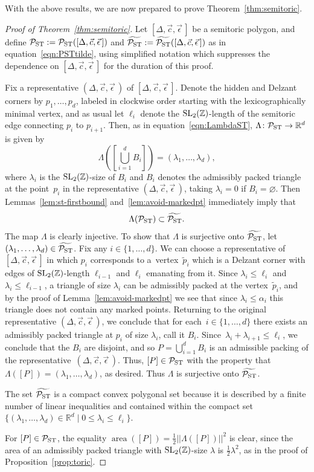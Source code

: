 \documentclass[pdftex]{sigma}
\numberwithin{equation}{section}
\def\R{{\mathbb R}}
\def\Z{{\mathbb Z}}
\newcommand{\De}{\Delta}
\newcommand{\area}{\operatorname{area}}
\newcommand{\PST}{\mathcal{P}_{\rm ST}}
\newcommand{\PSTtilde}{\widetilde{\mathcal{P}_{\rm ST}}}
\newcommand{\SL}{{\rm SL}_2(\Z)}
\newcommand{\stpoly}{[\De,\vec{c},\vec{\epsilon}\,]}
\newcommand{\strep}{(\De,\vec{c},\vec{\epsilon}\,)}
\begin{document}
With the above results, we are now prepared to prove Theorem~\ref{thm:semitoric}.

\begin{proof}[Proof of Theorem~\ref{thm:semitoric}]
Let $\stpoly$ be a semitoric polygon, and define $\PST := \PST (\stpoly)$ and $\PSTtilde := \PSTtilde(\stpoly)$ as in equation~\eqref{eqn:PSTtilde}, using simplified notation which suppresses the dependence on $\stpoly$ for the duration of this proof.

Fix a representative $\strep$ of $\stpoly$.
Denote the hidden and Delzant corners by $p_1,\ldots, p_d$, labeled in clockwise order starting with the lexicographically minimal vertex, and as usual let $\ell_i$ denote the $\SL$-length of the semitoric edge connecting $p_i$ to $p_{i+1}$.
Then, as in equation~\eqref{eqn:LambdaST}, $\Lambda\colon \PST \to \R^d$ is given by
\[
\Lambda\left(\left[\bigcup_{i=1}^d B_i\right]\right) = (\lambda_1,\ldots,\lambda_d),
\]
where $\lambda_i$ is the $\SL$-size of $B_i$ and $B_i$ denotes the admissibly packed triangle at the point~$p_i$ in the representative $\strep$, taking $\lambda_i=0$ if $B_i=\varnothing$.
Then Lemmas~\ref{lem:st-firstbound} and~\ref{lem:avoid-markedpt} immediately imply that
\[
 \Lambda(\PST)\subset \PSTtilde.
\]
The map $\Lambda$ is clearly injective.
To show that $\Lambda$ is surjective onto $\PSTtilde$, let $(\lambda_1,\ldots,\lambda_d)\in\PSTtilde$.
Fix any $i\in\{1,\ldots,d\}$.
We can choose a representative of $\stpoly$ in which $p_i$ corresponds to a~vertex~$\widetilde{p}_i$ which is a Delzant corner with edges of $\SL$-length $\ell_{i-1}$ and $\ell_i$ emanating from it.
Since $\lambda_i\leq \ell_i$ and $\lambda_i\leq \ell_{i-1}$, a triangle of size $\lambda_i$ can be admissibly packed at the vertex~$\widetilde{p}_i$, and by the proof of Lemma~\ref{lem:avoid-markedpt} we see that since $\lambda_i\leq \alpha_i$ this triangle does not contain any marked points.
Returning to the original representative $\strep$, we conclude that for each~$i\in\{1,\ldots,d\}$ there exists an admissibly packed triangle at $p_i$ of size $\lambda_i$, call it $B_i$.
Since~$\lambda_i+\lambda_{i+1}\leq \ell_i$, we conclude that the $B_i$ are disjoint, and so $P = \bigcup_{i=1}^d B_i$ is an admissible packing of the representative~$\strep$.
Thus, $[P]\in\PST$ with the property that~$\Lambda([P]) = (\lambda_1,\ldots,\lambda_d)$, as desired. Thus $\Lambda$ is surjective onto $\PSTtilde$.

The set $\PSTtilde$ is a compact convex polygonal set because it is described by a finite number of linear inequalities and contained within the compact set $\{(\lambda_1,\ldots,\lambda_d)\in\R^d \mid 0\leq \lambda_i\leq \ell_i\}$.

For $[P]\in\PST$, the equality $\area ([P]) = \frac{1}{2}||\Lambda([P])||^2$ is clear, since the area of an admissibly packed triangle with $\SL$-size $\lambda$ is $\frac{1}{2}\lambda^2$, as in the proof of Proposition~\ref{prop:toric}.
\end{proof}
\end{document}
